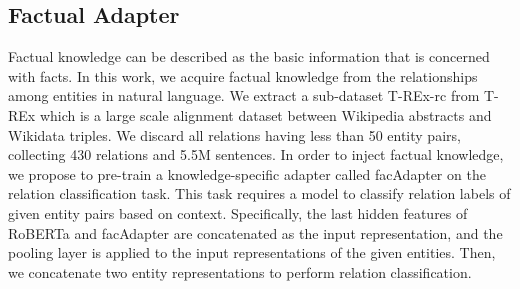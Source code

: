 \documentclass[11pt,a4paper]{article}
\begin{document}
\subsection{Factual Adapter}
Factual knowledge can be described as the basic information that is concerned with facts. 
In this work, we acquire factual knowledge from the relationships among entities in natural language.
We extract a sub-dataset T-REx-rc from T-REx \citep{ElSahar18trex} which is a large scale alignment dataset between Wikipedia abstracts and Wikidata triples. We discard all relations having less than 50 entity pairs, collecting 430 relations and 5.5M sentences.
In order to inject factual knowledge, we propose to pre-train a knowledge-specific adapter called facAdapter on the relation classification task. This task requires a model to classify relation labels of given entity pairs based on context. Specifically, the last hidden features of RoBERTa and facAdapter are concatenated as the input representation, and the pooling layer is applied to the input representations of the given entities. Then, we concatenate two entity representations to perform relation classiﬁcation.
\end{document}
